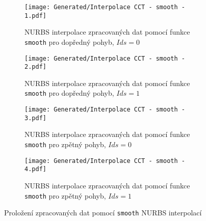 \begin{landscapeimagepage}
    \begin{figure}[H]
        \centering
        \begin{subfigure}{.5\textheight}
            \centering
            \texttt{[image: Generated/Interpolace CCT - smooth - 1.pdf]}
            \caption{NURBS interpolace zpracovaných dat pomocí funkce \texttt{smooth} pro dopředný pohyb, $Ids = 0$}
            \label{fig: NURBS interpolace zpracovaných dat pomocí funkce smooth pro dopředný pohyb, Ids = 0 m}
        \end{subfigure}
        \vspace{0.5cm}
        \hspace{2.5cm}
        \begin{subfigure}{.5\textheight}
            \centering
            \texttt{[image: Generated/Interpolace CCT - smooth - 2.pdf]}
            \caption{NURBS interpolace zpracovaných dat pomocí funkce \texttt{smooth} pro dopředný pohyb, $Ids = 1$}
            \label{fig: NURBS interpolace zpracovaných dat pomocí funkce smooth pro dopředný pohyb, Ids = 1 m}
        \end{subfigure}
        \vspace{0.5cm}
        \begin{subfigure}{.5\textheight}
            \centering
            \texttt{[image: Generated/Interpolace CCT - smooth - 3.pdf]}
            \caption{NURBS interpolace zpracovaných dat pomocí funkce \texttt{smooth} pro zpětný pohyb, $Ids = 0$}
            \label{fig: NURBS interpolace zpracovaných dat pomocí funkce smooth pro zpětný pohyb, Ids = 0 m}
        \end{subfigure}
        \hspace{2.5cm}
        \begin{subfigure}{.5\textheight}
            \centering
            \texttt{[image: Generated/Interpolace CCT - smooth - 4.pdf]}
            \caption{NURBS interpolace zpracovaných dat pomocí funkce \texttt{smooth} pro zpětný pohyb, $Ids = 1$}
            \label{fig: NURBS interpolace zpracovaných dat pomocí funkce smooth pro zpětný pohyb, Ids = 1 m}
        \end{subfigure}
        \caption{Proložení zpracovaných dat pomocí \texttt{smooth} NURBS interpolací}
        \label{}
    \end{figure}
\end{landscapeimagepage}

